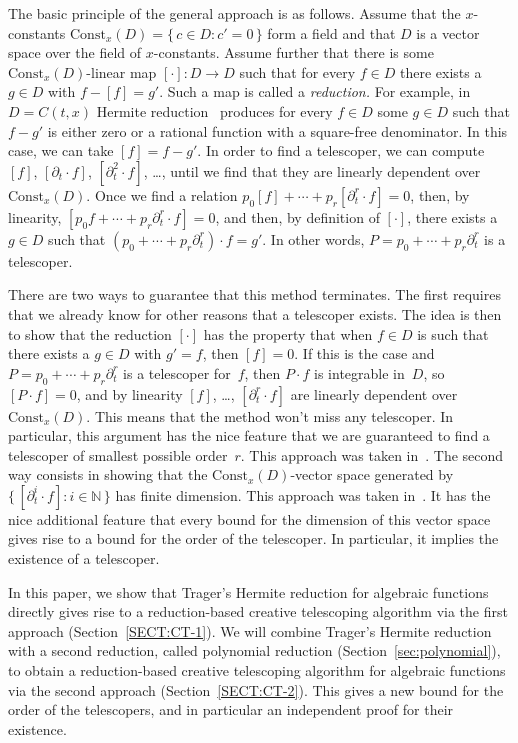 \documentclass{sig-alternate-05-2015}
\let\set\mathbb
\begin{document}
The basic principle of the general approach is as follows. Assume that the
$x$-constants $\mathrm{Const}_x(D)=\{\,c\in D:c'=0\,\}$ form a field and that $D$
is a vector space over the field of $x$-constants. Assume further that there is
some $\mathrm{Const}_x(D)$-linear map $[\cdot]\colon D\to D$ such that for every
$f\in D$ there exists a $g\in D$ with $f-[f]=g'$. Such a map is called a
\emph{reduction.} For example, in $D=C(t,x)$ Hermite reduction~\cite{Hermite1872} produces for
every $f\in D$ some $g\in D$ such that $f-g'$ is either zero or a rational function
with a square-free denominator. In this case, we can take $[f]=f-g'$.
In order to find a telescoper, we can compute $[f]$, $[\partial_t\cdot f]$, $[\partial_t^2\cdot f]$, \dots,
until we find that they are linearly dependent over $\mathrm{Const}_x(D)$.
Once we find a relation
$p_0[f] + \cdots + p_r[\partial_t^r\cdot f] = 0$,
then, by linearity,
$[p_0 f + \cdots + p_r \partial_t^r\cdot f] = 0$,
and then, by definition of $[\cdot]$, there exists a $g\in D$ such that $(p_0+\cdots + p_r\partial_t^r)\cdot f=g'$.
In other words, $P=p_0+\cdots + p_r\partial_t^r$ is a telescoper.

There are two ways to guarantee that this method terminates. The first requires that we already know for
other reasons that a telescoper exists. The idea is then to show that the
reduction $[\cdot]$ has the property that when $f\in D$ is such that there
exists a $g\in D$ with $g'=f$, then $[f]=0$. If this is the case and
$P=p_0+\cdots+p_r\partial_t^r$ is a telescoper for~$f$, then $P\cdot f$ is integrable
in~$D$, so $[P\cdot f]=0$, and by linearity $[f]$, \dots, $[\partial_t^r\cdot f]$ are
linearly dependent over $\mathrm{Const}_x(D)$. This means that the method won't
miss any telescoper. In particular, this argument has the nice feature that we
are guaranteed to find a telescoper of smallest possible order~$r$. This
approach was taken in~\cite{chen15a}.
The second way consists in showing that the $\mathrm{Const}_x(D)$-vector space generated
by $\{\,[\partial_t^i\cdot f]:i\in\set N\,\}$
has finite dimension. This approach was taken in~\cite{BCCL2010,bostan13a}. It has the
nice additional feature that every bound for the dimension of this vector space
gives rise to a bound for the order of the telescoper. In particular, it implies
the existence of a telescoper.

In this paper, we show that Trager's Hermite reduction for algebraic
functions directly gives rise to a reduction-based creative telescoping
algorithm via the first approach (Section~\ref{SECT:CT-1}). We will combine Trager's Hermite reduction
with a second reduction, called polynomial reduction (Section~\ref{sec:polynomial}), to obtain a reduction-based creative
telescoping algorithm for algebraic functions via the second approach (Section~\ref{SECT:CT-2}).
This gives a new bound for the order of the telescopers, and in
particular an independent proof for their existence.
\end{document}
